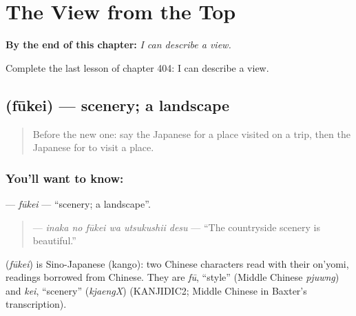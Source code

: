 
\chapter{The View from the Top}
\label{ch:ja-the-view-from-the-top}

\begin{chapteropening}
\textbf{By the end of this chapter:} \emph{I can describe a view.}

Complete the last lesson of chapter 404: I can describe a view.
\end{chapteropening}

\section[\texorpdfstring{\ja{ふうけい} (fūkei)}{ふうけい (fūkei)}]{ (fūkei) — scenery; a landscape}

\label{lesson:JA-C404-fuukei}



\begin{quote}
Before the new one: say the Japanese for a place visited on a trip, then the Japanese for to visit a place.
\end{quote}

\subsection*{You'll want to know: }
\textbf{} — \emph{fūkei} — \textquotedblleft{}scenery; a landscape\textquotedblright{}.

\begin{quote}
\textbf{  } — \emph{inaka no fūkei wa utsukushii desu} — \textquotedblleft{}The countryside scenery is beautiful.\textquotedblright{}
\end{quote}

\begin{cousinweb}
\textbf{} (\emph{fūkei}) is Sino-Japanese (kango): two Chinese characters read with their on'yomi, readings borrowed from Chinese. They are \emph{fū}, \textquotedblleft{}style\textquotedblright{} (Middle Chinese \emph{pjuwng}) and \emph{kei}, \textquotedblleft{}scenery\textquotedblright{} (\emph{kjaengX}) (KANJIDIC2; Middle Chinese in Baxter's transcription).
\end{cousinweb}

